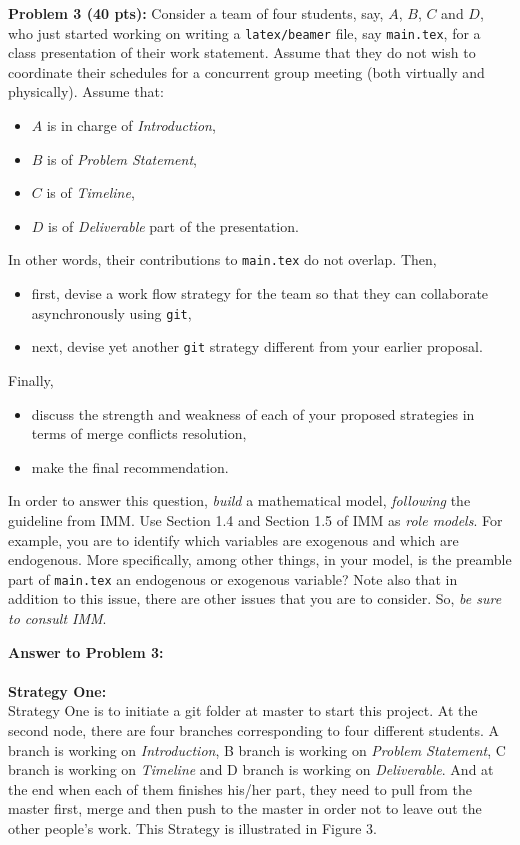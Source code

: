 \documentclass[12pt]{article}
\begin{document}
\newpage
\noindent\textbf{Problem 3 (40 pts):}
Consider a team of four students, say, $A$, $B$, $C$ and $D$, 
who just started working 
on writing a \texttt{latex/beamer} file, say \texttt{main.tex}, 
for a class presentation of their work statement.  
Assume that they do not wish to coordinate their schedules for a
concurrent group meeting (both virtually and physically).  
Assume that:
\begin{itemize}
\item $A$ is in charge of \emph{Introduction},
\item $B$ is of \emph{Problem Statement}, 
\item $C$ is of  \emph{Timeline},
\item $D$ is of \emph{Deliverable} part of the presentation.  
\end{itemize}
In other words, their contributions to \texttt{main.tex} do not overlap.
Then, 
\begin{itemize}
\item first, devise a work flow strategy for the team so that they can
  collaborate asynchronously using \texttt{git},
\item next, devise yet another \texttt{git} strategy different from your earlier
  proposal.  
\end{itemize}
Finally,
\begin{itemize}
\item discuss the strength and weakness of each of your proposed strategies in terms of merge
conflicts resolution,
\item make the final recommendation.  
\end{itemize}
In order to answer this question, \emph{build}
a mathematical model, \emph{following} the guideline from IMM. 
Use Section 1.4 and Section 1.5 of IMM as \emph{role models}.    
For example, you are to identify which variables  are exogenous 
and which are endogenous.  More specifically, among other things, 
in your model, is the preamble part of \texttt{main.tex} an endogenous 
or exogenous variable?  
Note also that in addition to this issue, there are other issues that
you are to consider.  So, \emph{be sure to consult IMM}. 

\newpage
\noindent\textbf{Answer to Problem 3:}\\
\\
\noindent\textbf{Strategy One:}\\
Strategy One is to initiate a git folder at master to start this project. At the second node, there are four branches corresponding to four different students. A branch is working on \emph{Introduction}, B branch is working on \emph{Problem Statement}, C branch is working on \emph{Timeline} and D branch is working on \emph{Deliverable}. And at the end when each of them finishes his/her part, they need to pull from the master first, merge and then push to the master in order not to leave out the other people's work. This Strategy is illustrated in Figure 3.
\end{document}
